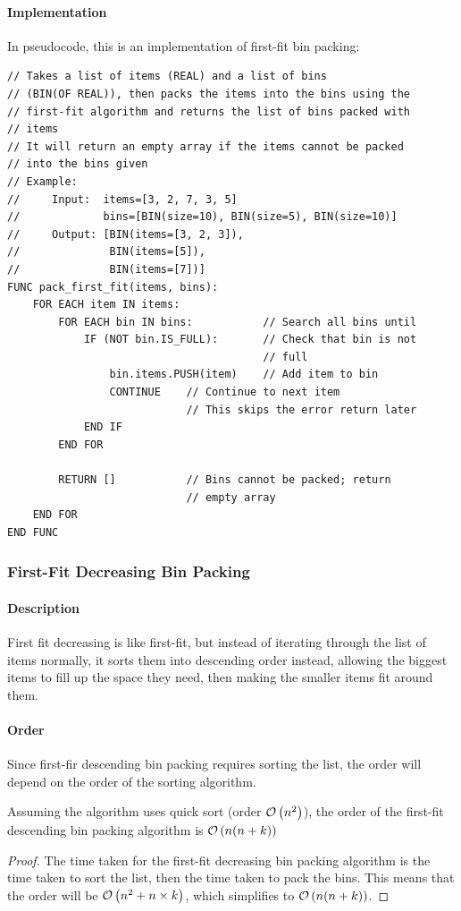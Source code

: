             \paragraph{Implementation}
                In pseudocode, this is an implementation of first-fit bin packing:
                \begin{verbatim}
// Takes a list of items (REAL) and a list of bins 
// (BIN(OF REAL)), then packs the items into the bins using the
// first-fit algorithm and returns the list of bins packed with
// items
// It will return an empty array if the items cannot be packed
// into the bins given
// Example:
//     Input:  items=[3, 2, 7, 3, 5]
//             bins=[BIN(size=10), BIN(size=5), BIN(size=10)]
//     Output: [BIN(items=[3, 2, 3]),
//              BIN(items=[5]),
//              BIN(items=[7])]
FUNC pack_first_fit(items, bins):
    FOR EACH item IN items:
        FOR EACH bin IN bins:           // Search all bins until
            IF (NOT bin.IS_FULL):       // Check that bin is not
                                        // full
                bin.items.PUSH(item)    // Add item to bin
                CONTINUE    // Continue to next item
                            // This skips the error return later
            END IF
        END FOR

        RETURN []           // Bins cannot be packed; return
                            // empty array
    END FOR
END FUNC
            \end{verbatim}

        \subsubsection{First-Fit Decreasing Bin Packing}
            \paragraph{Description}
                First fit decreasing is like first-fit, but instead of iterating through the list of items normally, it sorts them into descending order instead, allowing the biggest items to fill up the space they need, then making the smaller items fit around them.
            
            \paragraph{Order}
                Since first-fir descending bin packing requires sorting the list, the order will depend on the order of the sorting algorithm.
                \begin{theorem}
                    Assuming the algorithm uses quick sort (order $\mathcal{O}\left(n^2\right)$), the order of the first-fit descending bin packing algorithm is $\mathcal{O}\left(n(n+k)\right)$
                \end{theorem}
                \begin{proof}
                    The time taken for the first-fit decreasing bin packing algorithm is the time taken to sort the list, then the time taken to pack the bins.
                    This means that the order will be $\mathcal{O}\left(n^2+n\times k\right)$, which simplifies to $\mathcal{O}\left(n(n+k)\right)$.
                \end{proof}

